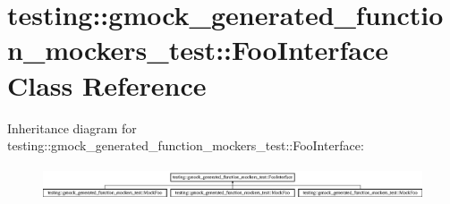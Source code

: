 \hypertarget{classtesting_1_1gmock__generated__function__mockers__test_1_1_foo_interface}{}\section{testing\+::gmock\+\_\+generated\+\_\+function\+\_\+mockers\+\_\+test\+::Foo\+Interface Class Reference}
\label{classtesting_1_1gmock__generated__function__mockers__test_1_1_foo_interface}
Inheritance diagram for testing\+::gmock\+\_\+generated\+\_\+function\+\_\+mockers\+\_\+test\+::Foo\+Interface\+:\begin{figure}[H]
\begin{center}
\leavevmode
\includegraphics[height=1.003584cm]{d3/d8c/classtesting_1_1gmock__generated__function__mockers__test_1_1_foo_interface}
\end{center}
\end{figure}

